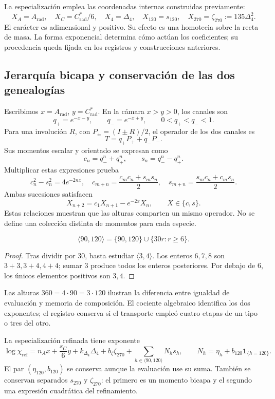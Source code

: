 La especialización emplea las coordenadas internas construidas previamente:
\[
 X_A=A_{\mathrm{rad}},\quad X_C=C^*_{\mathrm{rad}}/6,
 \quad X_4=\Delta_4,\quad X_{120}=s_{120},\quad
 X_{270}=\zeta_{270}:=135\Delta_4^2.
\]
El carácter es adimensional y positivo. Su efecto es una homotecia sobre
la recta de masa. La forma exponencial determina cómo actúan los
coeficientes; su procedencia queda fijada en los registros y construcciones
anteriores.

\subsection{Jerarquía bicapa y conservación de las dos genealogías}

Escribimos \(x=A_{\mathrm{rad}}\), \(y=C^*_{\mathrm{rad}}\). En la
cámara \(x>y>0\), los canales son
\[
 q_+=e^{-x-y},\qquad q_-=e^{-x+y},\qquad0<q_+<q_-<1.
\]
Para una involución \(R\), con \(P_\pm=(I\pm R)/2\), el operador
de los dos canales es
\[
 T=q_+P_++q_-P_-.
\]
Sus momentos escalar y orientado se expresan como
\[
 c_n=q_-^n+q_+^n,\qquad s_n=q_-^n-q_+^n.
\]
Multiplicar estas expresiones prueba
\[
 c_n^2-s_n^2=4e^{-2nx},\quad
 c_{m+n}=\frac{c_mc_n+s_ms_n}{2},\quad
 s_{m+n}=\frac{s_mc_n+c_ms_n}{2}.
\]
Ambas sucesiones satisfacen
\[
 X_{n+2}=c_1X_{n+1}-e^{-2x}X_n,\qquad X\in\{c,s\}.
\]
Estas relaciones muestran que las alturas comparten un mismo operador.
No se define una colección distinta de momentos para cada especie.

\begin{proposition}
\[
 \langle90,120\rangle=\{90,120\}\cup\{30r:r\ge6\}.
\]
\end{proposition}
\begin{proof}
Tras dividir por \(30\), basta estudiar \(\langle3,4\rangle\).
Los enteros \(6,7,8\) son \(3+3,3+4,4+4\); sumar \(3\) produce
todos los enteros posteriores. Por debajo de \(6\), los únicos
elementos positivos son \(3,4\).
\end{proof}

Las alturas \(360=4\cdot90=3\cdot120\) ilustran la diferencia entre
igualdad de evaluación y memoria de composición. El cociente algebraico
identifica los dos exponentes; el registro conserva si el transporte
empleó cuatro etapas de un tipo o tres del otro.

La especialización refinada tiene exponente
\[
 \log\chi_{\mathrm{ref}}=n_Ax+\frac{s_C}{6}y+k_{\Delta_4}\Delta_4
 +b_{\zeta}\zeta_{270}+\sum_{h\in\langle90,120\rangle}N_hs_h,
 \qquad N_h=\eta_h+b_{120}\mathbf1_{\{h=120\}}.
\]
El par \((\eta_{120},b_{120})\) se conserva aunque la evaluación use
su suma. También se conservan separados \(s_{270}\) y
\(\zeta_{270}\): el primero es un momento bicapa y el segundo una
expresión cuadrática del refinamiento.

